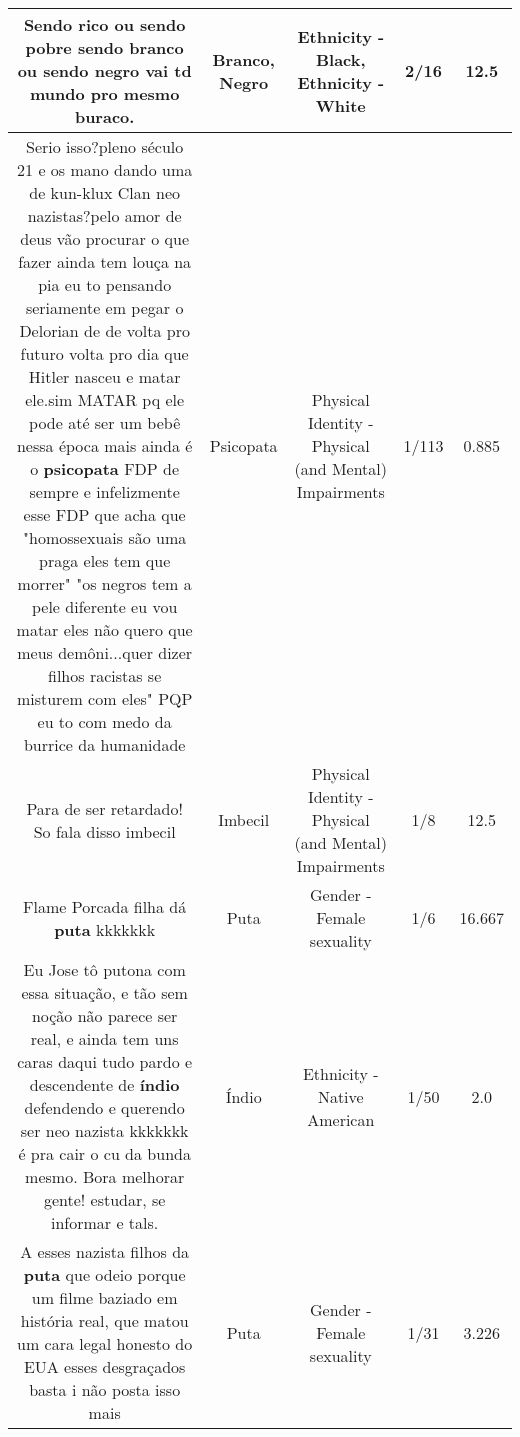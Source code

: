 \documentclass[11pt]{article}
\newlength\mylength
\begin{document}
\begin{center}
\begin{longtable}{|C{.65\mylength}|C{.30\mylength}|C{.12\mylength}|C{.12\mylength}|C{.12\mylength}|}
  \small Sendo rico ou sendo pobre sendo \textbf{branco} ou sendo \textbf{negro}  vai td mundo pro mesmo buraco.\normalsize   & Branco, Negro & Ethnicity - Black, Ethnicity - White & 2/16 & 12.5 \\  \hline
  \small Serio isso?pleno século 21 e os mano dando uma de kun-klux Clan neo nazistas?pelo amor de deus vão procurar o que fazer ainda tem louça na pia eu to pensando seriamente em pegar o Delorian de de volta pro futuro volta pro dia que Hitler nasceu e matar ele.sim MATAR pq ele pode até ser um bebê nessa época mais ainda é o \textbf{psicopata} FDP de sempre e infelizmente esse FDP que acha que "homossexuais são uma praga eles tem que morrer" "os negros tem a pele diferente eu vou matar eles não quero que meus demôni...quer dizer filhos racistas se misturem com eles" PQP eu to com medo da burrice da humanidade\normalsize   & Psicopata & Physical Identity - Physical (and Mental) Impairments & 1/113 & 0.885 \\  \hline
  \small Para de ser retardado!  So fala disso imbecil\normalsize   & Imbecil & Physical Identity - Physical (and Mental) Impairments & 1/8 & 12.5 \\  \hline
  \small Flame Porcada filha dá \textbf{puta} kkkkkkk\normalsize   & Puta & Gender - Female sexuality & 1/6 & 16.667 \\  \hline
  \small Eu Jose tô putona com essa situação,  e tão sem noção não parece ser real, e ainda tem uns   caras daqui tudo pardo e descendente de \textbf{índio} defendendo e querendo ser neo nazista kkkkkkk é pra cair o cu da bunda mesmo.  Bora melhorar gente! estudar, se informar e tals.\normalsize   & Índio & Ethnicity - Native American & 1/50 & 2.0 \\  \hline
  \small A esses nazista filhos da \textbf{puta} que odeio porque um filme baziado em história real, que matou um cara legal honesto do EUA esses desgraçados basta i não  posta isso mais\normalsize   & Puta & Gender - Female sexuality & 1/31 & 3.226 \\  \hline

\end{longtable}
\end{center}
\end{document}
